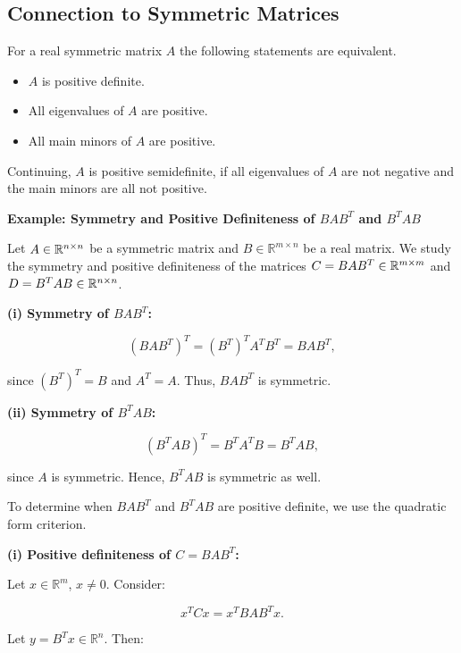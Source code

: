 \subsection{Connection to Symmetric Matrices}

For a real symmetric matrix \(A\) the following statements are equivalent.

\begin{itemize}
    
    \item \(A\) is positive definite.

    \item All eigenvalues of \(A\) are positive.

    \item All main minors of \(A\) are positive.

\end{itemize}

Continuing, \(A\) is positive semidefinite, if all eigenvalues of \(A\) are not negative and the 
main minors are all not positive.

\textbf{Example: Symmetry and Positive Definiteness of \(BAB^T\) and \(B^T A B\)}

Let \( A \in \mathbb{R}^{n \times n} \) be a symmetric matrix and \( B \in \mathbb{R}^{m \times n} \) 
be a real matrix. We study the symmetry and positive definiteness of the matrices 
\( C = BAB^T \in \mathbb{R}^{m \times m} \) and \( D = B^T A B \in \mathbb{R}^{n \times n} \).

\textbf{(i) Symmetry of \( BAB^T \):}  

\[
    (BAB^T)^T = (B^T)^T A^T B^T = B A B^T,
\]

since \( (B^T)^T = B \) and \( A^T = A \). Thus, \( BAB^T \) is symmetric.

\textbf{(ii) Symmetry of \( B^T A B \):}  

\[
    (B^T A B)^T = B^T A^T B = B^T A B,
\]

since \( A \) is symmetric. Hence, \( B^T A B \) is symmetric as well.

To determine when \( BAB^T \) and \( B^T A B \) are positive definite, we use the quadratic form criterion.

\textbf{(i) Positive definiteness of \( C = BAB^T \):}  

Let \( x \in \mathbb{R}^m \), \( x \ne 0 \). Consider:

\[
    x^T C x = x^T BAB^T x.
\]

Let \( y = B^T x \in \mathbb{R}^n \). Then:

